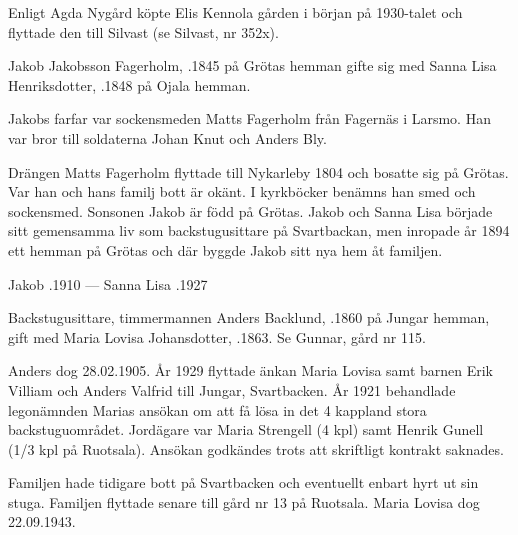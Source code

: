 Enligt Agda Nygård köpte Elis Kennola gården i början på 1930-talet och flyttade den till Silvast (se Silvast, nr 352x).


Jakob Jakobsson Fagerholm, .1845 på Grötas hemman gifte sig med Sanna Lisa Henriksdotter, .1848 på	Ojala hemman.
\begin{jhchildren}
  \item {}
  \item {}
  \item {}
  \item {}
\end{jhchildren}
Jakobs farfar var sockensmeden Matts Fagerholm från Fagernäs i Larsmo. Han var bror till soldaterna Johan Knut och Anders Bly.

Drängen Matts Fagerholm flyttade till Nykarleby 1804 och bosatte sig på Grötas. Var han och hans familj bott är okänt. I kyrkböcker benämns han smed och sockensmed. Sonsonen Jakob är född på Grötas. Jakob och Sanna Lisa började sitt gemensamma liv som backstugusittare på Svartbackan, men inropade år 1894 ett hemman på Grötas och där byggde Jakob sitt nya hem åt familjen.

Jakob .1910  ---  Sanna Lisa .1927






Backstugusittare, timmermannen Anders Backlund, .1860 på Jungar hemman, gift med Maria Lovisa Johansdotter, .1863. Se Gunnar, gård nr 115.

Anders dog 28.02.1905. År 1929 flyttade änkan Maria Lovisa samt barnen Erik Villiam och Anders Valfrid till Jungar, Svartbacken. År 1921 behandlade legonämnden Marias ansökan om att få lösa in det 4 kappland stora backstuguområdet. Jordägare var Maria Strengell (4 kpl) samt Henrik Gunell (1/3 kpl på Ruotsala). Ansökan godkändes trots att skriftligt kontrakt saknades.

Familjen hade tidigare bott på Svartbacken och eventuellt enbart hyrt ut sin stuga. Familjen flyttade senare till gård nr 13 på Ruotsala. Maria Lovisa dog 22.09.1943.


